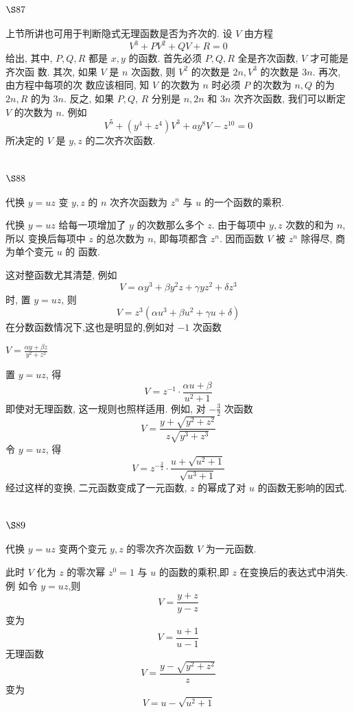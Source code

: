 \section{$\S 87$}

上节所讲也可用于判断隐式无理函数是否为齐次的. 设 $V$ 由方程
\[
V^{3}+P V^{2}+Q V+R=0
\]
给出, 其中, $P, Q, R$ 都是 $x, y$ 的函数. 首先必须 $P, Q, R$ 全是齐次函数, $V$ 才可能是齐次函 数. 其次, 如果 $V$ 是 $n$ 次函数, 则 $V^{2}$ 的次数是 $2 n, V^{3}$ 的次数是 $3 n$. 再次, 由方程中每项的次 数应该相同, 知 $V$ 的次数为 $n$ 时必须 $P$ 的次数为 $n, Q$ 的为 $2 n, R$ 的为 $3 n$. 反之, 如果 $P, Q$, $R$ 分别是 $n, 2 n$ 和 $3 n$ 次齐次函数, 我们可以断定 $V$ 的次数为 $n$. 例如
\[
V^{5}+\left(y^{4}+z^{4}\right) V^{3}+a y^{8} V-z^{10}=0
\]
所决定的 $V$ 是 $y, z$ 的二次齐次函数.

\section{$\S 88$}

代换 $y=u z$ 变 $y, z$ 的 $n$ 次齐次函数为 $z^{n}$ 与 $u$ 的一个函数的乘积.

代换 $y=u z$ 给每一项增加了 $y$ 的次数那么多个 $z$. 由于每项中 $y, z$ 次数的和为 $n$, 所以 变换后每项中 $z$ 的总次数为 $n$, 即每项都含 $z^{n}$. 因而函数 $V$ 被 $z^{n}$ 除得尽, 商为单个变元 $u$ 的 函数.

这对整函数尤其清楚, 例如
\[
V=\alpha y^{3}+\beta y^{2} z+\gamma y z^{2}+\delta z^{3}
\]
时, 置 $y=u z$, 则
\[
V=z^{3}\left(\alpha u^{3}+\beta u^{2}+\gamma u+\delta\right)
\]
在分数函数情况下,这也是明显的,例如对 $-1$ 次函数 

$V=\frac{\alpha y+\beta z}{y^2+z^2}$

置 $y=u z$, 得
\[
V=z^{-1} \cdot \frac{\alpha u+\beta}{u^{2}+1}
\]
即使对无理函数, 这一规则也照样适用. 例如, 对 $-\frac{3}{2}$ 次函数
\[
V=\frac{y+\sqrt{y^{2}+z^{2}}}{z \sqrt{y^{3}+z^{3}}}
\]
令 $y=u z$, 得
\[
V=z^{-\frac{3}{2}} \cdot \frac{u+\sqrt{u^{2}+1}}{\sqrt{u^{3}+1}}
\]
经过这样的变换, 二元函数变成了一元函数, $z$ 的幂成了对 $u$ 的函数无影响的因式.

\section{$\S 89$}

代换 $y=u z$ 变两个变元 $y, z$ 的零次齐次函数 $V$ 为一元函数.

此时 $V$ 化为 $z$ 的零次幂 $z^{0}=1$ 与 $u$ 的函数的乘积,即 $z$ 在变换后的表达式中消失. 例 如令 $y=u z$,则
\[
V=\frac{y+z}{y-z}
\]
变为
\[
V=\frac{u+1}{u-1}
\]
无理函数
\[
V=\frac{y-\sqrt{y^{2}+z^{2}}}{z}
\]
变为
\[
V=u-\sqrt{u^{2}+1}
\]
